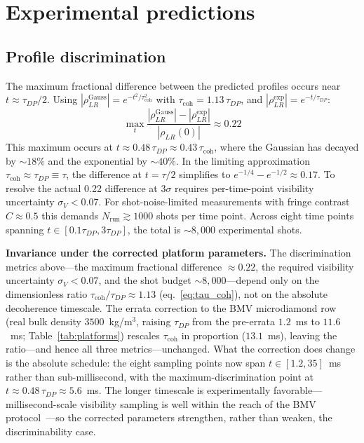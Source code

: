 \documentclass[12pt,a4paper]{article}
\theoremstyle{remark}
\begin{document}
\section{Experimental predictions}
\label{sec:predictions}

\subsection{Profile discrimination}

The maximum fractional difference between the predicted profiles occurs near
$t \approx \tau_{DP}/2$. Using $|\rho_{LR}^{\text{Gauss}}| = e^{-t^2/\tau_{\text{coh}}^2}$
with $\tau_{\text{coh}} = 1.13\,\tau_{DP}$, and
$|\rho_{LR}^{\text{exp}}| = e^{-t/\tau_{DP}}$:
\begin{equation}
\max_t\frac{|\rho_{LR}^{\text{Gauss}}| - |\rho_{LR}^{\text{exp}}|}{|\rho_{LR}(0)|}
\approx 0.22
\label{eq:delta_V}
\end{equation}
This maximum occurs at $t \approx 0.48\,\tau_{DP} \approx 0.43\,\tau_{\text{coh}}$,
where the Gaussian has decayed by $\sim18\%$ and the exponential by $\sim40\%$.
In the limiting approximation $\tau_{\text{coh}} \approx \tau_{DP} \equiv \tau$,
the difference at $t = \tau/2$ simplifies to $e^{-1/4} - e^{-1/2} \approx 0.17$.
To resolve the actual 0.22 difference at $3\sigma$ requires per-time-point visibility
uncertainty $\sigma_V < 0.07$. For shot-noise-limited measurements with fringe contrast
$C \approx 0.5$ this demands $N_{\text{run}} \gtrsim 1000$ shots per time point. Across
eight time points spanning $t \in [0.1\tau_{DP}, 3\tau_{DP}]$, the total is
$\sim 8{,}000$ experimental shots.

\textbf{Invariance under the corrected platform parameters.} The discrimination metrics
above---the maximum fractional difference $\approx 0.22$, the required visibility
uncertainty $\sigma_V < 0.07$, and the shot budget $\sim 8{,}000$---depend only on the
dimensionless ratio $\tau_{\text{coh}}/\tau_{DP} \approx 1.13$ (eq.~\eqref{eq:tau_coh}), not
on the absolute decoherence timescale. The errata correction to the BMV microdiamond row
(real bulk density $3500$~kg/m$^3$, raising $\tau_{DP}$ from the pre-errata $1.2$~ms to
$11.6$~ms; Table~\ref{tab:platforms}) rescales $\tau_{\text{coh}}$ in proportion
($13.1$~ms), leaving the ratio---and hence all three metrics---unchanged. What the
correction does change is the absolute schedule: the eight sampling points now span
$t \in [1.2, 35]$~ms rather than sub-millisecond, with the maximum-discrimination point at
$t \approx 0.48\,\tau_{DP} \approx 5.6$~ms. The longer timescale is experimentally
favorable---millisecond-scale visibility sampling is well within the reach of the BMV
protocol~\cite{bose}---so the corrected parameters strengthen, rather than weaken, the
discriminability case.
\end{document}
